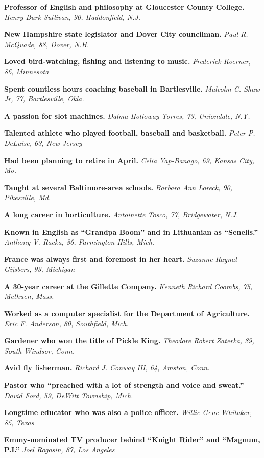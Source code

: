 \textbf{Professor of English and philosophy at Gloucester County
College.} \emph{Henry Burk Sullivan, 90, Haddonfield, N.J.}

\textbf{New Hampshire state legislator and Dover City councilman.}
\emph{Paul R. McQuade, 88, Dover, N.H.}

\textbf{Loved bird-watching, fishing and listening to music.}
\emph{Frederick Koerner, 86, Minnesota}

\textbf{Spent countless hours coaching baseball in Bartlesville.}
\emph{Malcolm C. Shaw Jr, 77, Bartlesville, Okla.}

\textbf{A passion for slot machines.} \emph{Dalma Holloway Torres, 73,
Uniondale, N.Y.}

\textbf{Talented athlete who played football, baseball and basketball.}
\emph{Peter P. DeLuise, 63, New Jersey}

\textbf{Had been planning to retire in April.} \emph{Celia Yap-Banago,
69, Kansas City, Mo.}

\textbf{Taught at several Baltimore-area schools.} \emph{Barbara Ann
Loreck, 90, Pikesville, Md.}

\textbf{A long career in horticulture.} \emph{Antoinette Tosco, 77,
Bridgewater, N.J.}

\textbf{Known in English as ``Grandpa Boom'' and in Lithuanian as
``Senelis.''} \emph{Anthony V. Racka, 86, Farmington Hills, Mich.}

\textbf{France was always first and foremost in her heart.}
\emph{Suzanne Raynal Gijsbers, 93, Michigan}

\textbf{A 30-year career at the Gillette Company.} \emph{Kenneth Richard
Coombs, 75, Methuen, Mass.}

\textbf{Worked as a computer specialist for the Department of
Agriculture.} \emph{Eric F. Anderson, 80, Southfield, Mich.}

\textbf{Gardener who won the title of Pickle King.} \emph{Theodore
Robert Zaterka, 89, South Windsor, Conn.}

\textbf{Avid fly fisherman.} \emph{Richard J. Conway III, 64, Amston,
Conn.}

\textbf{Pastor who ``preached with a lot of strength and voice and
sweat.''} \emph{David Ford, 59, DeWitt Township, Mich.}

\textbf{Longtime educator who was also a police officer.} \emph{Willie
Gene Whitaker, 85, Texas}

\textbf{Emmy-nominated TV producer behind ``Knight Rider'' and ``Magnum,
P.I.''} \emph{Joel Rogosin, 87, Los Angeles}

